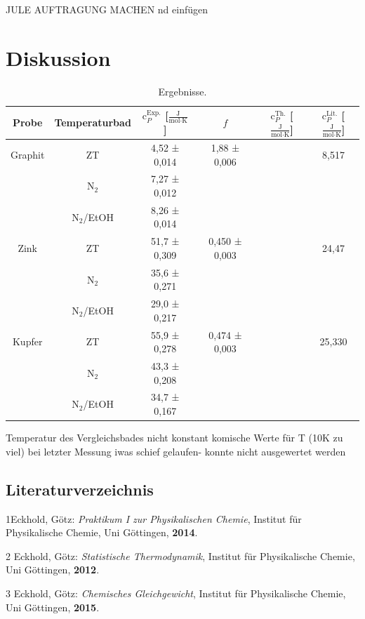 \documentclass[12pt,a4paper,titlepage,headinclude,bibtotoc]{scrartcl}
\begin{document}
JULE AUFTRAGUNG MACHEN nd einfügen

\section{Diskussion}
\begin{table}[h!]
\centering
\caption{Ergebnisse.}
\begin{tabular}{c|c|c|c|c|c}
Probe&Temperaturbad&$\text{c}_P^{\text{Exp.}}$ [$\frac{\text{J}}{\text{mol}\cdot\text{K}}$] & $f$ &$\text{c}_P^{\text{Th.}}$ [$\frac{\text{J}}{\text{mol}\cdot\text{K}}$] &$\text{c}_P^{\text{Lit.}}$ [$\frac{\text{J}}{\text{mol}\cdot\text{K}}$] \\
\hline
Graphit& ZT&4,52 ± 0,014 &1,88 ± 0,006& &8,517 \\
\hline
&$\text{N}_2$&7,27 ± 0,012& & \\
\hline
&$\text{N}_2$/EtOH&8,26 ± 0,014 & &\\
\hline
Zink &ZT& 51,7 ± 0,309&  0,450 ± 0,003& &24,47\\
\hline
&$\text{N}_2$& 35,6 ± 0,271&&\\
\hline
&$\text{N}_2$/EtOH& 29,0 ± 0,217&&\\
\hline
Kupfer &ZT&55,9 ± 0,278& 0,474 ± 0,003& &25,330\\
\hline
&$\text{N}_2$&43,3 ± 0,208&&\\
\hline
&$\text{N}_2$/EtOH& 34,7 ± 0,167&&\\
\end{tabular}
\end{table}
\FloatBarrier
Temperatur des Vergleichsbades nicht konstant
komische Werte für T (10K zu viel)
bei letzter Messung iwas schief gelaufen- konnte nicht ausgewertet werden


\newpage


\subsection{Literaturverzeichnis}
1\quad Eckhold, Götz: \emph{Praktikum I zur Physikalischen Chemie}, Institut für Physikalische Chemie, Uni Göttingen, \textbf{2014}.
\vspace{0,5 cm}

2 \quad Eckhold, Götz: \emph{Statistische Thermodynamik}, Institut für Physikalische Chemie, Uni Göttingen, \textbf{2012}.

\vspace{0,5cm}

3 \quad Eckhold, Götz: \emph{Chemisches Gleichgewicht}, Institut für Physikalische Chemie, Uni Göttingen, \textbf{2015}.\\
\end{document}
